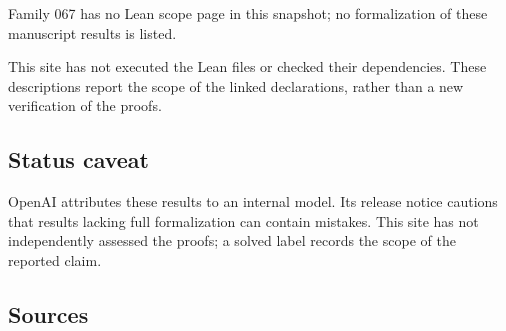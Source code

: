 \documentclass[11pt]{article}
\begin{document}
Family 067 has no Lean scope page in this snapshot; no formalization of these manuscript results is listed.

This site has not executed the Lean files or checked their dependencies. These descriptions report the scope of the linked declarations, rather than a new verification of the proofs.

\subsection{Status caveat}
OpenAI attributes these results to an internal model. Its release notice cautions that results lacking full formalization can contain mistakes. This site has not independently assessed the proofs; a solved label records the scope of the reported claim.

\subsection{Sources}
\end{document}

